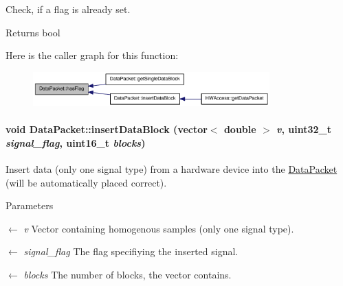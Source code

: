Check, if a flag is already set. \begin{DoxyReturn}{Returns}
bool 
\end{DoxyReturn}


Here is the caller graph for this function:\nopagebreak
\begin{figure}[H]
\begin{center}
\leavevmode
\includegraphics[width=258pt]{class_data_packet_a8fed63bfc2f0903b49d88805368d2161_icgraph}
\end{center}
\end{figure}
\hypertarget{class_data_packet_ab83c192471bb4d70cd21653adcc7da7f}{
\paragraph[{insertDataBlock}]{\setlength{\rightskip}{0pt plus 5cm}void DataPacket::insertDataBlock (vector$<$ double $>$ {\em v}, \/  uint32\_\-t {\em signal\_\-flag}, \/  uint16\_\-t {\em blocks})}\hfill}
\label{class_data_packet_ab83c192471bb4d70cd21653adcc7da7f}


Insert data (only one signal type) from a hardware device into the \hyperlink{class_data_packet}{DataPacket} (will be automatically placed correct). 
\begin{DoxyParams}{Parameters}
\item[\mbox{$\leftarrow$} {\em v}]Vector containing homogenous samples (only one signal type). \item[\mbox{$\leftarrow$} {\em signal\_\-flag}]The flag specifiying the inserted signal. \item[\mbox{$\leftarrow$} {\em blocks}]The number of blocks, the vector contains. \end{DoxyParams}

